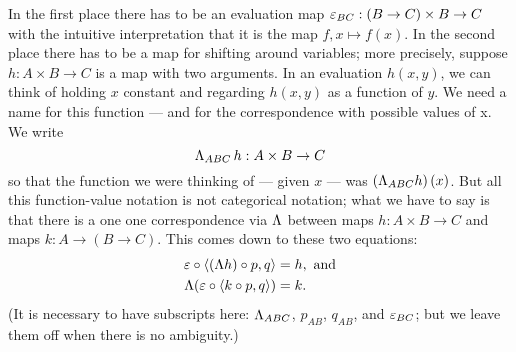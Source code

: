 In the first place there has to be an evaluation map $\varepsilon_{BC} : (B \rightarrow C) \times B \rightarrow C$
with the intuitive interpretation that it is the map $ f,x \mapsto f(x)$. In the second
place there has to be a map for shifting around variables; more precisely, suppose $h:
A\times B \to C$ is a map with two arguments. In an evaluation $h(x,y)$, we can think of
holding $x$ constant and regarding $h(x,y)$ as a function of $y$. We need a name for this
function --- and for the correspondence with possible values of x. We write
$$
\Lambda_{ABC}\, h : A\times B \rightarrow C
$$
%
so that the function we were thinking of --- given $x$ --- was $(\Lambda_{ABC} h)\, (x)$. But
all this function-value notation is not categorical notation; what we have to say is that
there is a one one correspondence via $\Lambda$ between maps $h : A\times B \to C$ and maps $k:
A \to (B \to C)$. This comes down to these two equations:
%
\begin{align*}
\varepsilon \circ \langle (\Lambda h)\circ p, q\rangle &= h, {\textrm{ and}} \\
\Lambda(\varepsilon \circ \langle k \circ p, q \rangle) &= k.
\end{align*}
%
(It is necessary to have subscripts here: $\Lambda_{ABC}$, $p_{AB}$, $q_{AB}$, and $\varepsilon_{BC}$; but
we leave them off when there is no ambiguity.)

